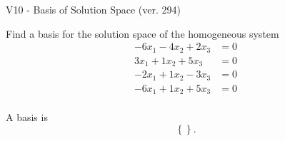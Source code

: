\begin{exercise}
  \begin{exerciseTitle}V10 - Basis of Solution Space (ver. 294)\end{exerciseTitle}
  \begin{exerciseStatement}
    Find a basis for the solution space of the homogeneous system 
\begin{align*}
 -6 x_ 1 -4 x_ 2 + 2 x_ 3 &= 0  \\ 
  3 x_ 1 + 1 x_ 2 + 5 x_ 3 &= 0  \\ 
  -2 x_ 1 + 1 x_ 2 -3 x_ 3 &= 0  \\ 
  -6 x_ 1 + 1 x_ 2 + 5 x_ 3 &= 0  \\ 
 \end{align*}


 
  \end{exerciseStatement}

  \begin{exerciseAnswer}
   A basis is   
\[\left\{\right\}.\]

  


  \end{exerciseAnswer}
\end{exercise}